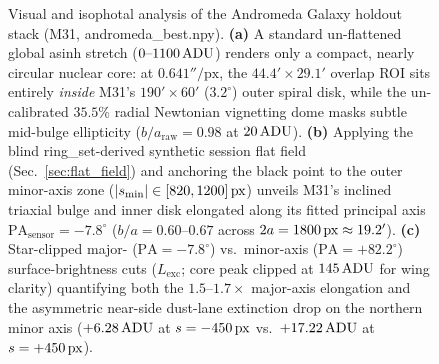 \documentclass[10pt,twocolumn,letterpaper]{article}
\DeclareRobustCommand{\code}[1]{\texttt{#1}}
\def\code#1{#1}%
\begin{document}
\begin{figure}[t]
{%
  }
  \vspace{-0.4em}
  \caption{Visual and isophotal analysis of the Andromeda Galaxy holdout stack (M31, \code{andromeda\_best.npy}). \textbf{(a)} A standard un-flattened global \code{asinh} stretch ($0\text{--}1100\text{\,ADU}$) renders only a compact, nearly circular nuclear core: at $0.641''/\text{px}$, the $44.4' \times 29.1'$ overlap ROI sits entirely \emph{inside} M31's $190' \times 60'$ ($3.2^\circ$) outer spiral disk, while the un-calibrated $35.5\%$ radial Newtonian vignetting dome masks subtle mid-bulge ellipticity ($b/a_{\text{raw}} = 0.98$ at $20\text{\,ADU}$). \textbf{(b)} Applying the blind \code{ring\_set}-derived synthetic session flat field (Sec.~\ref{sec:flat_field}) and anchoring the black point to the outer minor-axis zone ($|s_{\min}| \in [820, 1200]\text{\,px}$) unveils M31's inclined triaxial bulge and inner disk elongated along its fitted principal axis $\text{PA}_{\text{sensor}} = -7.8^\circ$ ($b/a = 0.60\text{--}0.67$ across $2a = 1800\text{\,px} \approx 19.2'$). \textbf{(c)} Star-clipped major- ($\text{PA}=-7.8^\circ$) vs.\ minor-axis ($\text{PA}=+82.2^\circ$) surface-brightness cuts ($L_{\text{exc}}$; core peak clipped at $145\text{\,ADU}$ for wing clarity) quantifying both the $1.5\text{--}1.7\times$ major-axis elongation and the asymmetric near-side dust-lane extinction drop on the northern minor axis ($+6.28\text{\,ADU}$ at $s = -450\text{\,px}$ vs.\ $+17.22\text{\,ADU}$ at $s = +450\text{\,px}$).}
  \label{fig:m31_visual}
\end{figure}
\end{document}
